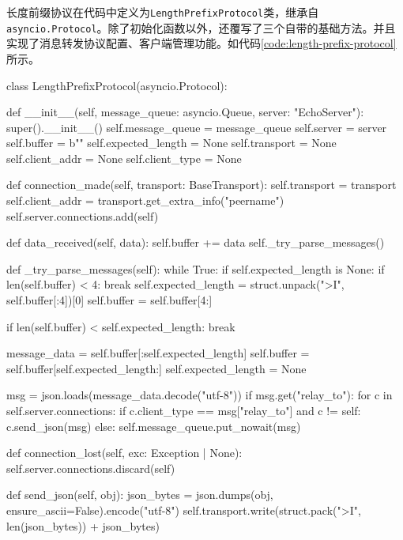 \documentclass[bachelor]{njupthesis}
\begin{document}
长度前缀协议在代码中定义为\texttt{LengthPrefixProtocol}类，继承自\texttt{asyncio.Protocol}。除了初始化函数以外，还覆写了三个自带的基础方法。并且实现了消息转发协议配置、客户端管理功能。如代码\ref{code:length-prefix-protocol}所示。


\begin{code}
\caption{LengthPrefixProtocol类定义}
\label{code:length-prefix-protocol}
\begin{codebox}
class LengthPrefixProtocol(asyncio.Protocol):

    def __init__(self, message_queue: asyncio.Queue, server: "EchoServer"):
        super().__init__()
        self.message_queue = message_queue
        self.server = server
        self.buffer = b""
        self.expected_length = None
        self.transport = None
        self.client_addr = None
        self.client_type = None

    def connection_made(self, transport: BaseTransport):
        self.transport = transport
        self.client_addr = transport.get_extra_info("peername")
        self.server.connections.add(self)

    def data_received(self, data):
        self.buffer += data
        self._try_parse_messages()

    def _try_parse_messages(self):
        while True:
            if self.expected_length is None:
                if len(self.buffer) < 4:
                    break
                self.expected_length = struct.unpack(">I", self.buffer[:4])[0]
                self.buffer = self.buffer[4:]

            if len(self.buffer) < self.expected_length:
                break

            message_data = self.buffer[:self.expected_length]
            self.buffer = self.buffer[self.expected_length:]
            self.expected_length = None

            msg = json.loads(message_data.decode("utf-8"))
            if msg.get("relay_to"):
                for c in self.server.connections:
                    if c.client_type == msg["relay_to"] and c != self:
                        c.send_json(msg)
            else:
                self.message_queue.put_nowait(msg)

    def connection_lost(self, exc: Exception | None):
        self.server.connections.discard(self)

    def send_json(self, obj):
        json_bytes = json.dumps(obj, ensure_ascii=False).encode("utf-8")
        self.transport.write(struct.pack(">I", len(json_bytes)) + json_bytes)
\end{codebox}
\end{code}
\end{document}
